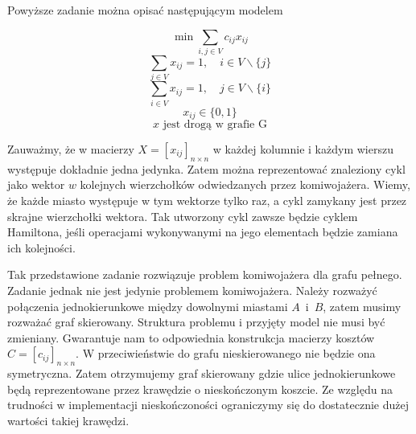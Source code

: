\documentclass[11pt,a4paper,twoside]{article}
\begin{document}
Powyższe zadanie można opisać następującym modelem

\begin{equation}
\min \sum_{i,j \in V} c_{ij} x_{ij} 
\label{f_celu}
\end{equation}
\begin{equation}
\sum_{j \in V} x_{ij}=1, \quad i \in V \backslash \{j\} 
\end{equation}
\begin{equation}
\sum_{i \in V} x_{ij}=1, \quad j \in V \backslash \{i\} 
\end{equation}
\begin{equation}
x_{ij} \in \{0,1\}
\end{equation}
\begin{equation}
x \text{ jest drogą w grafie G}
\end{equation}



Zauważmy, że w macierzy $X = [x_{ij}]_{n\times n}$ w każdej kolumnie i każdym wierszu występuje dokładnie jedna jedynka. Zatem można reprezentować znaleziony cykl jako wektor $w$ kolejnych wierzchołków odwiedzanych przez komiwojażera. Wiemy, że każde miasto występuje w tym wektorze tylko raz, a cykl zamykany jest przez skrajne wierzchołki wektora. Tak utworzony cykl zawsze będzie cyklem Hamiltona, jeśli operacjami wykonywanymi na jego elementach będzie zamiana ich kolejności.

Tak przedstawione zadanie rozwiązuje problem komiwojażera dla grafu pełnego. Zadanie jednak nie jest jedynie problemem komiwojażera. Należy rozważyć połączenia jednokierunkowe między dowolnymi miastami \mbox{$A$ i $B$}, zatem musimy rozważać graf skierowany. Struktura problemu i przyjęty model nie musi być zmieniany. Gwarantuje nam to odpowiednia konstrukcja macierzy kosztów $C = [c_{ij}]_{n\times n}$. W przeciwieństwie do grafu nieskierowanego nie będzie ona symetryczna. Zatem otrzymujemy graf skierowany gdzie ulice jednokierunkowe będą reprezentowane przez krawędzie o nieskończonym koszcie. Ze względu na trudności w implementacji nieskończoności ograniczymy się do dostatecznie dużej wartości takiej krawędzi.
\end{document}
